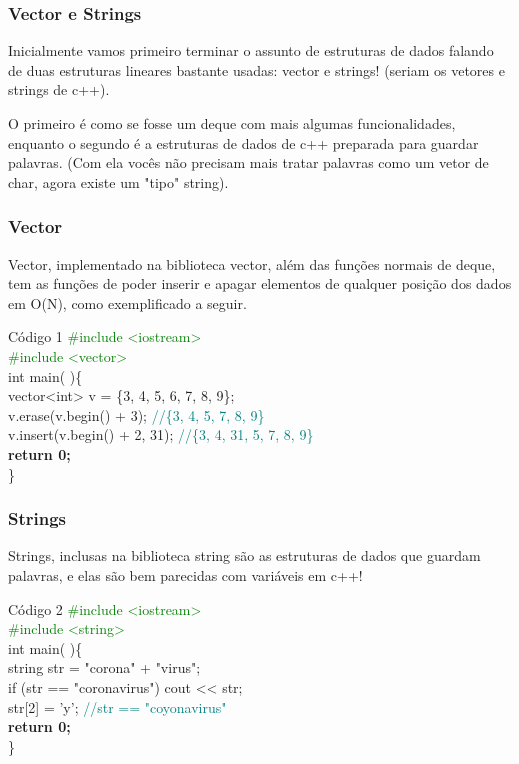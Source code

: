 \documentclass{beamer}
\begin{document}
	\begin{frame}
	\frametitle{Vector e Strings}
	    Inicialmente vamos primeiro terminar o assunto de estruturas de dados
	    falando de duas estruturas lineares bastante usadas: vector e strings!
	    (seriam os vetores e strings de c++).\par
	    O primeiro é como se fosse um deque com mais algumas funcionalidades,
	    enquanto o segundo é a estruturas de dados de c++ preparada para guardar
	    palavras. (Com ela vocês não precisam mais tratar palavras como um vetor
	    de char, agora existe um "tipo" string).
	\end{frame}
	\begin{frame}
	\frametitle{Vector}
		Vector, implementado na biblioteca vector, além das funções normais de
		deque, tem as funções de poder inserir e apagar elementos de qualquer
		posição dos dados em O(N), como exemplificado
		a seguir. \par
		\begin{block}{Código 1}
		\textcolor{green}{\#include \textless iostream\textgreater}\\
		\textcolor{green}{\#include \textless vector\textgreater}\\
		\vspace{20pt}
		int main( )\{\\
		\hspace{10 pt} vector<int> v = \{3, 4, 5, 6, 7, 8, 9\};\\
		\hspace{10 pt} v.erase(v.begin() + 3);
		\textcolor{teal}{//\{3, 4, 5, 7, 8, 9\}}\\
		\hspace{10 pt} v.insert(v.begin() + 2, 31);
		\textcolor{teal}{//\{3, 4, 31, 5, 7, 8, 9\}}\\
		\hspace{14 pt}\textbf{return 0;}\\
		\}
	\end{block}
	\end{frame}
	\begin{frame}
	\frametitle{Strings}
		Strings, inclusas na biblioteca string
		são as estruturas de dados que guardam palavras, e elas são
		bem parecidas com variáveis em c++!\par
		\begin{block}{Código 2}
		\textcolor{green}{\#include \textless iostream\textgreater}\\
		\textcolor{green}{\#include \textless string\textgreater}\\
		\vspace{20pt}
		int main( )\{\\
		\hspace{10 pt} string str = "corona" + "virus";\\
		\hspace{10 pt} if (str == "coronavirus") cout << str;\\
		\hspace{10 pt} str[2] = 'y';
		\textcolor{teal}{//str == "coyonavirus"}\\
		\hspace{14 pt}\textbf{return 0;}\\
		\}
		\end{block}
	\end{frame}
\end{document}
